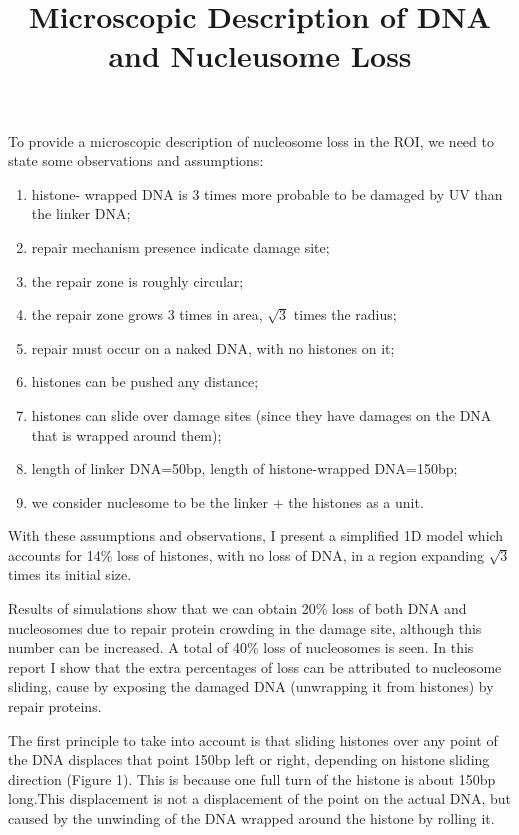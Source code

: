 \documentclass[12pt]{paper}
\begin{document}
\title{Microscopic Description of DNA and Nucleusome Loss}
\maketitle
  To provide a microscopic description of nucleosome loss in the ROI, we need to state some observations and assumptions:
  \begin{enumerate}
  	\itemsep0em
  	\item histone- wrapped DNA is 3 times more probable to be damaged by UV than the linker DNA;
  	\item repair mechanism presence indicate damage site;
  	\item the repair zone is roughly circular;
  	\item the repair zone grows 3 times in area, $\sqrt{3}$ times the radius;
  	\item repair must occur on a naked DNA, with no histones on it; 
  	\item histones can be pushed any distance;
  	\item histones can slide over damage sites (since they have damages on the DNA that is wrapped around them);
  	\item length of linker DNA=50bp, length of histone-wrapped DNA=150bp;
  	\item we consider nuclesome to be the linker + the histones as a unit.   
  \end{enumerate}
     With these assumptions and observations, I present a simplified 1D model which accounts for 14\% loss of histones, with no loss of DNA, in a region expanding $\sqrt{3}$ times its initial size. 
     
     Results of simulations show that we can obtain 20\% loss of both DNA and nucleosomes due to repair protein crowding in the damage site, although this number can be increased. A total of 40\% loss of nucleosomes is seen. In this report I show that the extra percentages of loss can be attributed to nucleosome sliding, cause by exposing the damaged DNA (unwrapping it from histones) by repair proteins.
     
     The first principle to take into account is that sliding histones over any point of the DNA displaces that point 150bp left or right, depending on histone sliding direction (Figure 1). This is because one full turn of the histone is about 150bp long.This displacement is not a displacement of the point on the actual DNA, but caused by the unwinding of the DNA wrapped around the histone by rolling it.
     
\end{document}
